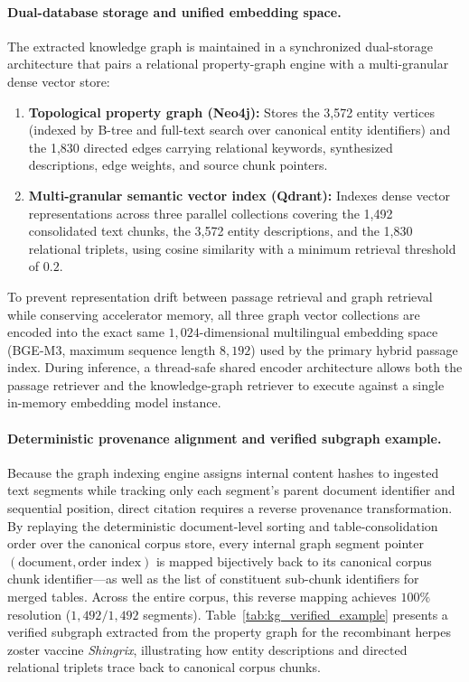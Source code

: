 \documentclass[sn-mathphys, oneside]{sn-jnl}
\begin{document}
\paragraph{Dual-database storage and unified embedding space.}
The extracted knowledge graph is maintained in a synchronized dual-storage architecture that pairs a relational property-graph engine with a multi-granular dense vector store:
\begin{enumerate}
\item \textbf{Topological property graph (Neo4j):} Stores the 3,572 entity vertices (indexed by B-tree and full-text search over canonical entity identifiers) and the 1,830 directed edges carrying relational keywords, synthesized descriptions, edge weights, and source chunk pointers.
\item \textbf{Multi-granular semantic vector index (Qdrant):} Indexes dense vector representations across three parallel collections covering the 1,492 consolidated text chunks, the 3,572 entity descriptions, and the 1,830 relational triplets, using cosine similarity with a minimum retrieval threshold of $0.2$.
\end{enumerate}
To prevent representation drift between passage retrieval and graph retrieval while conserving accelerator memory, all three graph vector collections are encoded into the exact same $1,024$-dimensional multilingual embedding space (BGE-M3, maximum sequence length $8,192$) used by the primary hybrid passage index. During inference, a thread-safe shared encoder architecture allows both the passage retriever and the knowledge-graph retriever to execute against a single in-memory embedding model instance.

\paragraph{Deterministic provenance alignment and verified subgraph example.}
Because the graph indexing engine assigns internal content hashes to ingested text segments while tracking only each segment's parent document identifier and sequential position, direct citation requires a reverse provenance transformation. By replaying the deterministic document-level sorting and table-consolidation order over the canonical corpus store, every internal graph segment pointer $(\text{document}, \text{order index})$ is mapped bijectively back to its canonical corpus chunk identifier—as well as the list of constituent sub-chunk identifiers for merged tables. Across the entire corpus, this reverse mapping achieves $100\%$ resolution ($1,492/1,492$ segments). Table~\ref{tab:kg_verified_example} presents a verified subgraph extracted from the property graph for the recombinant herpes zoster vaccine \emph{Shingrix}, illustrating how entity descriptions and directed relational triplets trace back to canonical corpus chunks.
\end{document}
